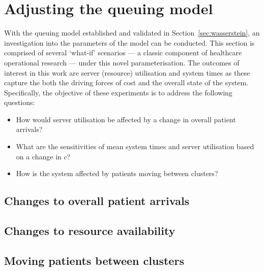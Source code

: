\section{Adjusting the queuing model}\label{sec:scenarios}

With the queuing model established and validated in
Section~\ref{sec:wasserstein}, an investigation into the parameters of the model
can be conducted. This section is comprised of several `what-if' scenarios --- a
classic component of healthcare operational research --- under this novel
parameterisation. The outcomes of interest in this work are server (resource)
utilisation and system times as these capture the both the driving forces of
cost and the overall state of the system. Specifically, the objective of these
experiments is to address the following questions:
\begin{itemize}
    \item How would server utilisation be affected by a change in overall
        patient arrivals?
    \item What are the sensitivities of mean system times and server utilisation
        based on a change in \(c\)?
    \item How is the system affected by patients moving between clusters?
\end{itemize}

\subsection{Changes to overall patient arrivals}\label{subsec:arrivals}

\subsection{Changes to resource availability}\label{subsec:resources}

\subsection{Moving patients between clusters}\label{subsec:moving}

